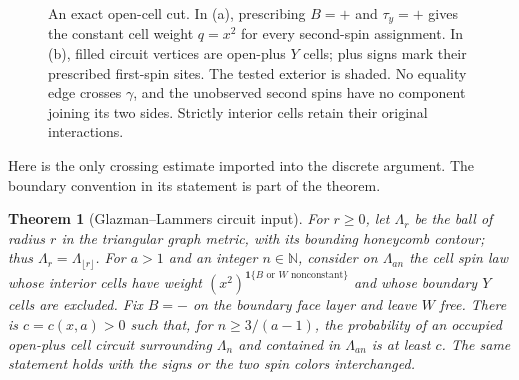 \documentclass[11pt]{article}
\newcommand{\N}{\mathbb N}
\newcommand{\ind}{\mathbf 1}
\newtheorem{theorem}{Theorem}[section]
\theoremstyle{definition}
\theoremstyle{remark}
\numberwithin{equation}{section}
\begin{document}
\begin{figure}[tbp]

 \caption{An exact open-cell cut. In (a), prescribing $B=+$ and
 $\tau_y=+$ gives the constant cell weight $q=x^2$ for every second-spin
 assignment. In (b), filled circuit vertices are open-plus $Y$ cells;
 plus signs mark their prescribed first-spin sites. The tested exterior
 is shaded. No equality edge crosses $\gamma$, and the unobserved second
 spins have no component joining its two sides. Strictly interior cells
 retain their original interactions.}
 \label{discrete:fig-cut}
\end{figure}

\begin{samepage}
Here is the only crossing estimate imported into the discrete argument.
The boundary convention in its statement is part of the theorem.

\begin{theorem}[Glazman--Lammers circuit input]\label{thm:circuit-input}
For $r\ge0$, let $\Lambda_r$ be the ball of radius $r$ in the triangular
graph metric, with its bounding honeycomb contour; thus
$\Lambda_r=\Lambda_{\lfloor r\rfloor}$. For $a>1$ and an integer
$n\in\N$, consider on
$\Lambda_{an}$ the cell spin law whose
interior cells have weight $(x^2)^{\ind\{B\text{ or }W\text{ nonconstant}\}}$
and whose boundary $Y$ cells are excluded. Fix $B=-$ on the boundary face
layer and leave $W$ free. There is $c=c(x,a)>0$ such
that, for $n\ge 3/(a-1)$, the probability of an occupied open-plus cell
circuit surrounding $\Lambda_n$ and contained in $\Lambda_{an}$ is at
least $c$. The same statement holds with the signs or the two spin colors
interchanged.
\end{theorem}
\end{samepage}
\end{document}
